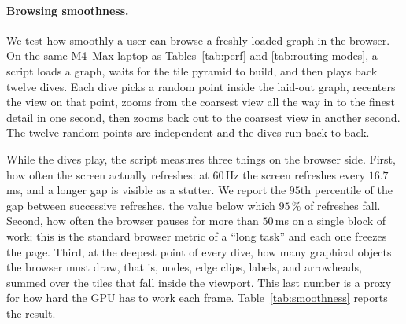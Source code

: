 \paragraph{Browsing smoothness.}
We test how smoothly a user can browse a freshly loaded graph in the
browser. On the same M4~Max laptop as Tables~\ref{tab:perf} and
\ref{tab:routing-modes}, a script loads a graph, waits for the tile
pyramid to build, and then plays back twelve dives. Each dive picks
a random point inside the laid-out graph, recenters the view on that
point, zooms from the coarsest view all the way in to the finest
detail in one second, then zooms back out to the coarsest view in
another second. The twelve random points are independent and the
dives run back to back.

While the dives play, the script measures three things on the
browser side. First, how often the screen actually refreshes: at
$60$\,Hz the screen refreshes every $16.7$\,ms, and a longer gap is
visible as a stutter. We report the $95$th percentile of the gap
between successive refreshes, the value below which $95\,\%$ of
refreshes fall. Second, how often the browser pauses for more than
$50$\,ms on a single block of work; this is the standard browser
metric of a ``long task'' and each one freezes the page. Third, at
the deepest point of every dive, how many graphical objects the
browser must draw, that is, nodes, edge clips, labels, and
arrowheads, summed over the tiles that fall inside the viewport.
This last number is a proxy for how hard the GPU has to work each
frame. Table~\ref{tab:smoothness} reports the result.

